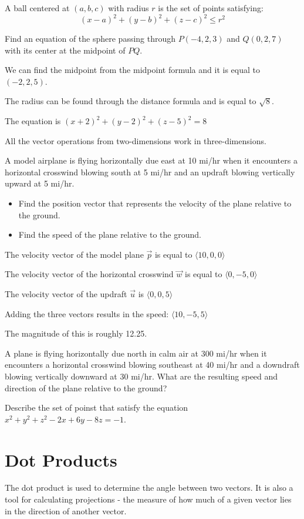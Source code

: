 \documentclass[../calc3.tex]{subfiles}
\begin{document}
A ball centered at $(a,b,c)$ with radius $r$ is the set of points satisfying:
\[(x-a)^2+(y-b)^2+(z-c)^2\leq r^2\]

\begin{example}
Find an equation of the sphere passing through $P(-4,2,3)$ and $Q(0,2,7)$ with its center at the midpoint of $PQ$.

We can find the midpoint from the midpoint formula and it is equal to $(-2,2,5)$. 

The radius can be found through the distance formula and is equal to $\sqrt{8}$.

The equation is $(x+2)^2+(y-2)^2+(z-5)^2=8$
\end{example}

All the vector operations from two-dimensions work in three-dimensions. 
\begin{example}
A model airplane is flying horizontally due east at 10 mi/hr when it encounters a horizontal 
crosswind blowing south at 5 mi/hr and an updraft blowing vertically upward at 5 mi/hr. 
\begin{itemize}
    \item Find the position vector that represents the velocity of the plane relative to the ground.
    \item Find the speed of the plane relative to the ground.
\end{itemize}
The velocity vector of the model plane $\vec{p}$ is equal to $\langle 10,0,0 \rangle$

The velocity vector of the horizontal crosswind $\vec{w}$ is equal to $\langle 0,-5,0\rangle$

The velocity vector of the updraft $\vec{u}$ is $\langle 0,0,5\rangle$

Adding the three vectors results in the speed: $\langle 10,-5,5\rangle$

The magnitude of this is roughly 12.25.
\end{example}

\ex A plane is flying horizontally due north in calm air at 300 mi/hr when it encounters a horizontal crosswind blowing southeast at 40 mi/hr and a downdraft blowing vertically downward at 30 mi/hr. 
What are the resulting speed and direction of the plane relative to the ground?

\ex Describe the set of poinst that satisfy the equation $x^2+y^2+z^2-2x+6y-8z=-1$.

\section{Dot Products}
The dot product is used to determine the angle between two vectors. It is also a tool for calculating projections - the measure of how much of a given vector lies in the direction of another vector.
\end{document}
